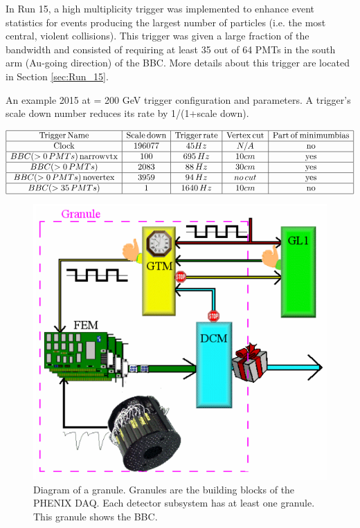 In Run 15, a high multiplicity trigger was implemented to enhance event statistics for events producing the largest number of particles (i.e. the most central, violent collisions). This trigger was given a large fraction of the bandwidth and consisted of requiring at least 35 out of 64 PMTs in the south arm (Au-going direction) of the BBC. More details about this trigger are located in Section \ref{sec:Run_15}.
\begin{table}[h!]
\centering
\caption{An example 2015 \pau at \sqsn = 200 GeV trigger configuration and parameters. A trigger's scale down number reduces its rate by 1/(1+scale down). }%
    $\begin{array}{|c|c|c|c|c|}
    \hline 
    \rm Trigger\thinspace \rm Name & \rm Scale\thinspace \rm down & \rm Trigger\thinspace \rm rate & \rm Vertex\thinspace \rm cut & \rm Part\thinspace \rm of\thinspace \rm minimum \rm bias \\ \hline
     \rm Clock & 196077 & 45 Hz  & N/A & \rm no \\ \hline
    BBC(>0\thinspace PMTs)\thinspace \rm narrowvtx& 100 &  695\thinspace Hz &  10 cm & \rm yes\\ \hline
    BBC(>0\thinspace PMTs)  & 2083 & 88\thinspace Hz &  30 cm & \rm yes\\ \hline
    BBC(>0\thinspace PMTs)\thinspace \rm novertex& 3959 &94\thinspace Hz  &no\thinspace cut & \rm yes\\ \hline
    BBC(>35\thinspace  PMTs) & 1 & 1640\thinspace Hz &  10 cm & \rm no \\ \hline
    \end{array}$
\label{tbl:trigger_config}
\end{table}

\begin{figure}[!ht]
\centering
\includegraphics[width=0.55\linewidth]{figs/granule_diagram.png}
\caption{Diagram of a granule. Granules are the building blocks of the PHENIX DAQ. Each detector subsystem has at least one granule. This granule shows the BBC.} %
\label{fig:granule_diag}
\end{figure}

